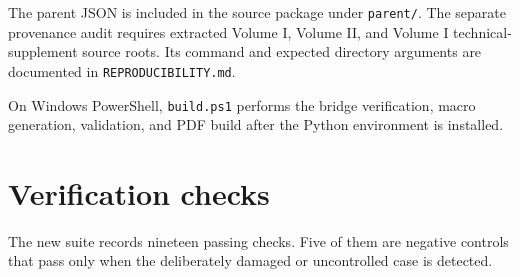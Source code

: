 The parent JSON is included in the source package under \texttt{parent/}.  The separate provenance audit requires extracted Volume I, Volume II, and Volume I technical-supplement source roots.  Its command and expected directory arguments are documented in \texttt{REPRODUCIBILITY.md}.

On Windows PowerShell, \texttt{build.ps1} performs the bridge verification, macro generation, validation, and PDF build after the Python environment is installed.

\section{Verification checks}

The new suite records nineteen passing checks.  Five of them are negative controls that pass only when the deliberately damaged or uncontrolled case is detected.

